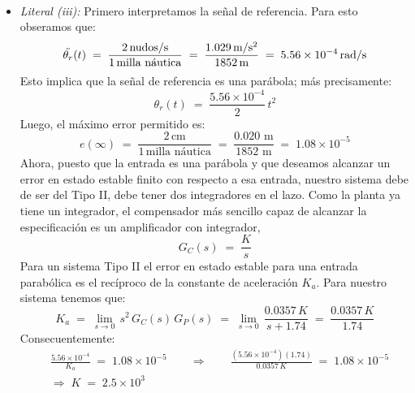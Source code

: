 \documentclass[ a4paper, twoside, 11pt]{article}
\begin{document}
\begin{problem}
\begin{itemize}
\begin{align*}
\end{align*}
\item \emph{Literal (iii):} Primero interpretamos la se\~nal de referencia. Para esto obseramos que: 
\[
\ddot{\theta_r}(t) \; = \; 
\frac{2 \, \text{nudos/s}}{1 \, \text{milla n\'autica}} \; = \; 
\frac{1.029 \, \text{m/s\ensuremath{^{\text{2}}}}}{1852 \, \text{m}} \; = \; 5.56 \times 10^{-4} \, \text{rad/s}
\]
Esto implica que la se\~nal de referencia es una par\'abola; m\'as precisamente: 
\[
\theta_r(t) \; = \; \frac{ 5.56 \times 10^{-4}}{2} \, t^2
\]
Luego, el m\'aximo error permitido es: 
\[
e(\infty)
\; = \; \frac{2 \, \text{cm}}{1 \, \text{milla n\'autica}}
\; = \; \frac{0.020 \text{ m}}{1852 \text{ m}} \; = \; 1.08 \times 10^{-5}
\]
Ahora, puesto que la entrada es una par\'abola y que deseamos alcanzar un error en estado estable finito con respecto a esa entrada, nuestro sistema debe de ser del Tipo II, \ie debe tener dos integradores en el lazo. Como la planta ya tiene un integrador, el compensador m\'as sencillo capaz de alcanzar la especificaci\'on es un amplificador con integrador, \iec
\[
G_C(s) \; = \; \frac{K}{s}
\]
Para un sistema Tipo II el error en estado estable para una entrada parab\'olica es el rec\'iproco de la constante de aceleraci\'on $K_a$. Para nuestro sistema tenemos que: 
\[
K_a \; = \; \lim_{ s \rightarrow 0 } \, s^2 \, G_C(s) \, G_P(s)
\; = \; \lim_{ s \rightarrow 0 } \, \frac{0.0357 \, K}{s + 1.74} \; = \; \frac{0.0357 \, K}{1.74}
\]
Consecuentemente: 
\begin{align*}
& \frac{ 5.56 \times 10^{-4} }{K_a} \; = \; 1.08 \times 10^{-5} \qquad
\Longrightarrow \qquad \frac{(5.56 \times 10^{-4})(1.74)}{0.0357 \, K} \; = \; 1.08 \times 10^{-5} \\[1ex]
& \Longrightarrow \; K \; = \; 2.5 \times 10^3
\end{align*}

\end{itemize}

\end{problem}
\vspace{\baselineskip}
\end{document}
